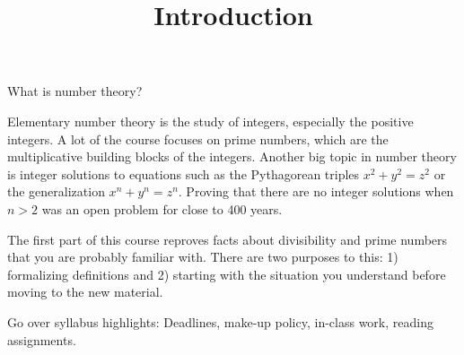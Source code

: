 \documentclass{ximera}
\title{Introduction}
\begin{document}
\begin{abstract}
\end{abstract}
\maketitle


What is number theory?

Elementary number theory is the study of integers, especially the positive integers. A lot of the course focuses on prime numbers, which are the multiplicative building blocks of the integers. Another big topic in number theory is integer solutions to equations such as the Pythagorean triples $x^2+y^2=z^2$ or the generalization $x^n+y^n=z^n$. Proving that there are no integer solutions when $n>2$ was an open problem for close to 400 years.

The first part of this course reproves facts about divisibility and prime numbers that you are probably familiar with. There are two purposes to this: 1) formalizing definitions and 2) starting with the situation you understand before moving to the new material.


\begin{instructorNotes}
  Go over syllabus highlights: Deadlines, make-up policy, in-class work, reading assignments.
\end{instructorNotes}
\end{document}
